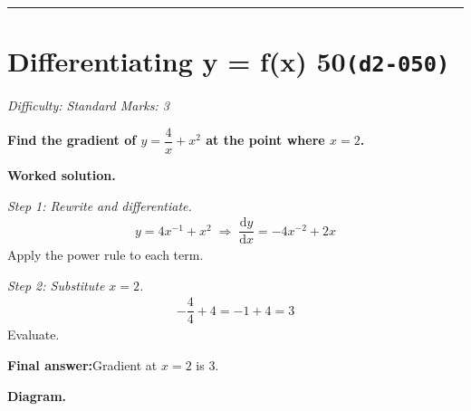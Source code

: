 \documentclass[11pt]{article}
\newcommand{\question}[1]{\par\medskip\noindent\textbf{#1}\par}
\begin{document}
\medskip\hrule

\section*{Differentiating y = f(x) 50\quad\small\texttt{(d2-050)}}
\textit{Difficulty: Standard \quad\textbar\quad Marks: 3}

\question{Find the gradient of \( y = \dfrac{4}{x} + x^2 \) at the point where \( x = 2 \).}

\textbf{Worked solution.}

\textit{Step 1: Rewrite and differentiate.}
\[\begin{gathered}
y = 4x^{-1} + x^2 \;\Rightarrow\; \dfrac{\mathrm{d}y}{\mathrm{d}x} = -4x^{-2} + 2x
\end{gathered}\]
Apply the power rule to each term.

\textit{Step 2: Substitute \( x = 2 \).}
\[\begin{gathered}
-\dfrac{4}{4} + 4 = -1 + 4 = 3
\end{gathered}\]
Evaluate.

\begin{answerbox}
\textbf{Final answer:}\quad Gradient at \(\displaystyle  x = 2 \) is \(\displaystyle  3 \).
\end{answerbox}
\textbf{Diagram.}
\end{document}
